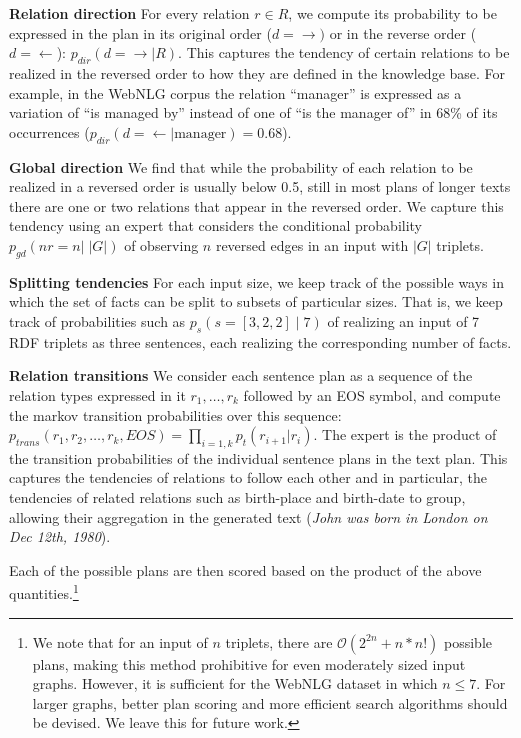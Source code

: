 \documentclass[11pt,a4paper]{article}
\begin{document}
\noindent\textbf{Relation direction} 
For every relation $r\in R$, we compute its probability to be expressed in the plan in its original order ($d=\rightarrow)$ or in the reverse order ($d=\leftarrow$): $p_{dir}(d=\rightarrow | R)$.
This captures the tendency of certain relations to be realized in the reversed order to how they are defined in the knowledge base.
For example, in the WebNLG corpus the relation ``manager'' is expressed as a variation of ``is managed by'' instead of one of ``is the manager of'' in 68\% of its occurrences ($p_{dir}(d=\leftarrow | \text{manager})=0.68$).

\noindent\textbf{Global direction} 
We find that while the probability of each relation to be realized in a reversed order is usually below 0.5, still in most plans of longer texts there are one or two relations that appear in the reversed order. 
We capture this tendency using an expert that considers the conditional probability $p_{gd}(nr=n | \; |G|)$ of observing $n$ reversed edges in an input with $|G|$ triplets.

\noindent\textbf{Splitting tendencies}
For each input size, we keep track of the possible ways in which the set of facts can be split to subsets of particular sizes. 
That is, we keep track of probabilities such as $p_s(s=[3,2,2] \;|\; 7)$ of realizing an input of 7 RDF triplets as three sentences, each realizing the corresponding number of facts.

\noindent\textbf{Relation transitions}
We consider each sentence plan as a sequence of the relation types expressed in it $r_1,\ldots,r_k$ followed by an EOS symbol, and compute the markov transition probabilities over this sequence: $p_{trans}(r_1,r_2,\ldots,r_k,EOS) = \prod_{i=1,k} p_t(r_{i+1}|r_{i})$. The expert is the product of the transition probabilities of the individual sentence plans in the text plan.
This captures the tendencies of relations to follow each other and in particular, the tendencies of related relations such as birth-place and birth-date to group, allowing their aggregation in the generated text (\emph{John was born in London on Dec 12th, 1980}).


Each of the possible plans are then scored based on the product of the above quantities.\footnote{We note that for an input of $n$ triplets, there are $\mathcal{O}(2^{2n} + n*n!)$ possible plans,
making this method prohibitive for even moderately sized input graphs. However, it is sufficient for the WebNLG dataset in which $n\leq 7$. For larger graphs, better plan scoring and more efficient search algorithms should be devised. We leave this for future work.}
\end{document}
